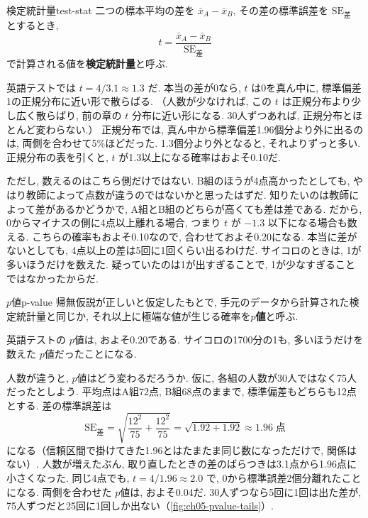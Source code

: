     \begin{defi}{検定統計量}{test-stat}
      二つの標本平均の差を $\bar{x}_A - \bar{x}_B$, その差の標準誤差を $\mathrm{SE}_{\text{差}}$ とするとき,
      \[
        t = \frac{\bar{x}_A - \bar{x}_B}{\mathrm{SE}_{\text{差}}}
      \]
      で計算される値を\textbf{検定統計量}と呼ぶ.
    \end{defi}

    英語テストでは $t = 4 / 3.1 \approx 1.3$ だ.
    本当の差が0なら, $t$ は0を真ん中に, 標準偏差1の正規分布に近い形で散らばる.
    （人数が少なければ, この $t$ は正規分布より少し広く散らばり, 前の章の $t$ 分布に近い形になる. 30人ずつあれば, 正規分布とほとんど変わらない.）
    正規分布では, 真ん中から標準偏差1.96個分より外に出るのは, 両側を合わせて5\%ほどだった.
    1.3個分より外となると, それよりずっと多い.
    正規分布の表を引くと, $t$ が1.3以上になる確率はおよそ0.10だ.

    ただし, 数えるのはこちら側だけではない.
    B組のほうが4点高かったとしても, やはり教師によって点数が違うのではないかと思ったはずだ.
    知りたいのは教師によって差があるかどうかで, A組とB組のどちらが高くても差は差である.
    だから, 0からマイナスの側に4点以上離れる場合, つまり $t$ が $-1.3$ 以下になる場合も数える.
    こちらの確率もおよそ0.10なので, 合わせておよそ0.20になる.
    本当に差がないとしても, 4点以上の差は5回に1回くらい出るわけだ.
    サイコロのときは, 1が多いほうだけを数えた.
    疑っていたのは1が出すぎることで, 1が少なすぎることではなかったからだ.

    \begin{defi}{$p$値}{p-value}
      帰無仮説が正しいと仮定したもとで, 手元のデータから計算された検定統計量と同じか, それ以上に極端な値が生じる確率を\textbf{$p$値}と呼ぶ.
    \end{defi}

    英語テストの $p$値は, およそ0.20である.
    サイコロの1700分の1も, 多いほうだけを数えた $p$値だったことになる.

    人数が違うと, $p$値はどう変わるだろうか.
    仮に, 各組の人数が30人ではなく75人だったとしよう.
    平均点はA組72点, B組68点のままで, 標準偏差もどちらも12点とする.
    差の標準誤差は
    \[
      \mathrm{SE}_{\text{差}} = \sqrt{\frac{12^2}{75} + \frac{12^2}{75}} = \sqrt{1.92 + 1.92} \approx 1.96\;\text{点}
    \]
    になる（信頼区間で掛けてきた1.96とはたまたま同じ数になっただけで, 関係はない）.
    人数が増えたぶん, 取り直したときの差のばらつきは3.1点から1.96点に小さくなった.
    同じ4点でも, $t = 4 / 1.96 \approx 2.0$ で, 0から標準誤差2個分離れたことになる.
    両側を合わせた $p$値は, およそ0.04だ.
    30人ずつなら5回に1回は出た差が, 75人ずつだと25回に1回しか出ない（\cref{fig:ch05-pvalue-tails}）.

